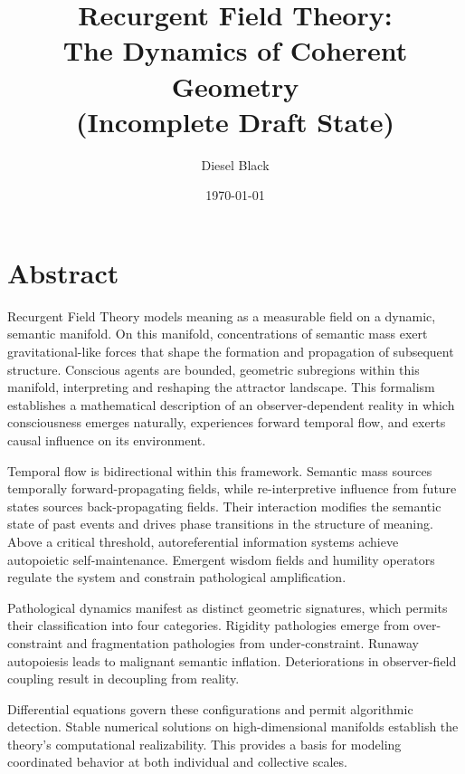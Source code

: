 \documentclass[11pt, a4paper]{report}
\title{Recurgent Field Theory: \\ The Dynamics of Coherent Geometry \\ \vspace{1em} \small{(Incomplete Draft State)}}
\author{Diesel Black}
\date{\today}
\begin{document}

\maketitle

\section*{Abstract}

Recurgent Field Theory models meaning as a measurable field on a dynamic, semantic manifold. On this manifold, concentrations of semantic mass exert gravitational-like forces that shape the formation and propagation of subsequent structure. Conscious agents are bounded, geometric subregions within this manifold, interpreting and reshaping the attractor landscape. This formalism establishes a mathematical description of an observer-dependent reality in which consciousness emerges naturally, experiences forward temporal flow, and exerts causal influence on its environment.

\vspace{1em}

Temporal flow is bidirectional within this framework. Semantic mass sources temporally forward-propagating fields, while re-interpretive influence from future states sources back-propagating fields. Their interaction modifies the semantic state of past events and drives phase transitions in the structure of meaning. Above a critical threshold, autoreferential information systems achieve autopoietic self-maintenance. Emergent wisdom fields and humility operators regulate the system and constrain pathological amplification.

\vspace{1em}

Pathological dynamics manifest as distinct geometric signatures, which permits their classification into four categories. Rigidity pathologies emerge from over-constraint and fragmentation pathologies from under-constraint. Runaway autopoiesis leads to malignant semantic inflation. Deteriorations in observer-field coupling result in decoupling from reality.

\vspace{1em}

Differential equations govern these configurations and permit algorithmic detection. Stable numerical solutions on high-dimensional manifolds establish the theory's computational realizability. This provides a basis for modeling coordinated behavior at both individual and collective scales.
\end{document}
